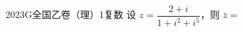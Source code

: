 
\begin{problem}{2023}{G}{全国乙卷（理）}{1}{复数}
设 $ z = \dfrac{2 + i}{1 + i^2 + i^5} $，则 $ \bar{z} = $
\begin{choices}
\end{choices}
\end{problem}

\begin{answer}

\end{answer}

\begin{solutions}

\end{solutions}
